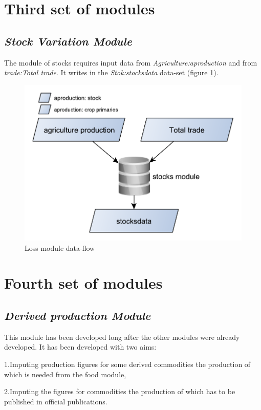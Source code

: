 \documentclass[]{article}
\begin{document}
\section{Third set of modules}\label{third-set-of-modules}

\subsection{\texorpdfstring{\emph{Stock Variation
Module}}{Stock Variation Module}}\label{stock-variation-module}

The module of stocks requires input data from
\emph{Agriculture:aproduction} and from \emph{trade:Total trade}. It
writes in the \emph{Stok:stocksdata} data-set (figure \ref{fig:f13}).

\begin{figure}[H]

{\centering \includegraphics[width=0.45\linewidth]{images/SwsFbs/13_stock} 

}

\caption{\label{fig:f13}Loss module data-flow}\label{fig:f13}
\end{figure}

\section{Fourth set of modules}\label{fourth-set-of-modules}

\subsection{\texorpdfstring{\emph{Derived production
Module}}{Derived production Module}}\label{derived-production-module}

This module has been developed long after the other modules were already
developed. It has been developed with two aims:

1.Imputing production figures for some derived commodities the
production of which is needed from the food module,

2.Imputing the figures for commodities the production of which has to be
published in official publications.
\end{document}
